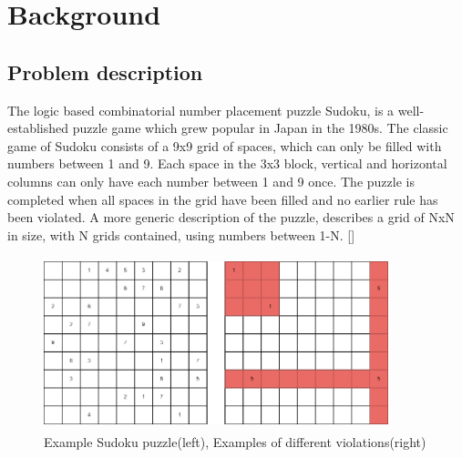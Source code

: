 \documentclass[a4paper,11pt]{article}
\begin{document}
\section{Background}

\subsection{Problem description}
The logic based combinatorial number placement puzzle Sudoku, is a well-established puzzle game which grew popular in Japan in the 1980s. The classic game of Sudoku consists of a 9x9 grid of spaces, which can only be filled with numbers between 1 and 9. Each space in the 3x3 block, vertical and horizontal columns can only have each number between 1 and 9 once. The puzzle is completed when all spaces in the grid have been filled and no earlier rule has been violated. A more generic description of the puzzle, describes a grid of NxN in size, with N grids contained, using numbers between 1-N. []
\begin{figure}[h]
	\caption{Example Sudoku puzzle(left), Examples of different violations(right)}
	\centering
	\includegraphics[height=5cm, width=10cm]{./Diagrams/violationExample}
\end{figure}
\end{document}
